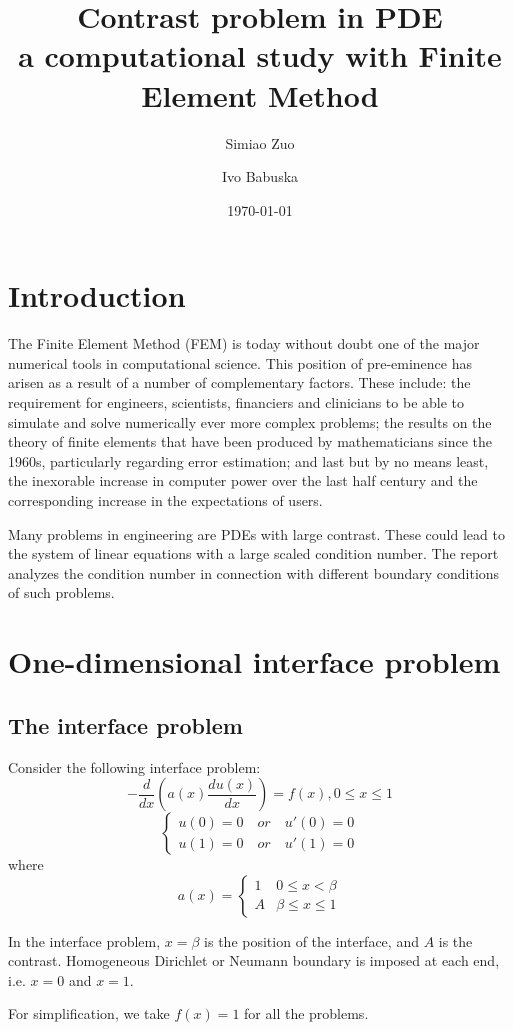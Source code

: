 \documentclass[12pt]{article}
\title{\LARGE \textbf{Contrast problem in PDE} \\ \large \textbf{a computational study with Finite Element Method}}
\date{\today}
\author[1]{Simiao Zuo}
\author[2]{Ivo Babuska}
\affil[1]{Department of Computer Science, The University of Texas at Austin}
\affil[2]{Institute for Computational Engineering and Sciences, The University of Texas at Austin}
\begin{document}
\maketitle

\section{Introduction}
The Finite Element Method (FEM) is today without doubt one of the major numerical tools in computational science. This position of pre-eminence has arisen as a result of a number of complementary factors. These include: the requirement for engineers, scientists, financiers and clinicians to be able to simulate and solve numerically ever more complex problems; the results on the theory of finite elements that have been produced by mathematicians since the 1960s, particularly regarding error estimation; and last but by no means least, the inexorable increase in computer power over the last half century and the corresponding increase in the expectations of users.

Many problems in engineering are PDEs with large contrast. These could lead to the system of linear equations with a large scaled condition number. The report analyzes the condition number in connection with different boundary conditions of such problems.

\section{One-dimensional interface problem}
\subsection{The interface problem}
Consider the following interface problem: $$-\frac{d}{dx}(a(x)\frac{du(x)}{dx})=f(x), 0\leq x \leq 1$$
\[
\begin{cases}
u(0)=0 \quad or \quad u'(0)=0 \\
u(1)=0 \quad or \quad u'(1)=0
\end{cases}
\]
where
\[
a(x)=
\begin{cases}
1 & 0 \leq x < \beta \\
A & \beta \leq x \leq 1
\end{cases}
\]

In the interface problem, $x=\beta$ is the position of the interface, and $A$ is the contrast. Homogeneous Dirichlet or Neumann boundary is imposed at each end, i.e. $x=0$ and $x=1$.

For simplification, we take $f(x)=1$ for all the problems.
\end{document}
